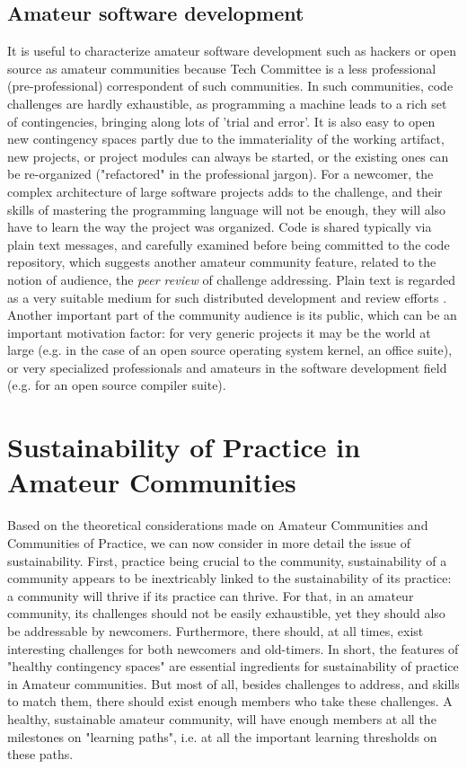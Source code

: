 \documentclass{sig-alt-release2}
\begin{document}
\subsection{Amateur software development}\label{sec:amateur_devel}
It is useful to characterize amateur software development such as hackers \cite{levy94} or open source \cite{kollock99} as amateur communities 
because Tech Committee is a less professional (pre-professional) correspondent of such communities. 
In such communities, code challenges are hardly exhaustible, as programming a machine leads to a rich set of contingencies, bringing along lots of 'trial and error'. 
It is also easy to open new contingency spaces partly due to the immateriality of the working artifact, new projects, or project modules can always be started, or the existing ones can be re-organized ("refactored" in the professional jargon). For a newcomer, the complex architecture of large software projects adds to the challenge, and their skills of mastering the programming language will not be enough, they will also have to learn the way the project was organized.
Code is shared typically via plain text messages, and carefully examined before being committed to the code repository, which suggests another amateur community feature, related to the notion of audience, the \textit{peer review} of challenge addressing. 
Plain text is regarded as a very suitable medium for such distributed development and review efforts \cite{yamauchi00}. 
Another important part of the community audience is its public, which can be an important motivation factor: for very generic projects it may be the world at large (e.g. in the case of an open source operating system kernel, an office suite), or very specialized professionals and amateurs in the software development field (e.g. for an open source compiler suite).

\section{Sustainability of Practice in Amateur Communities}\label{sec:sust}
Based on the theoretical considerations made on Amateur Communities and Communities of Practice, we can now consider in more detail the issue of sustainability. First, practice being crucial to the community, sustainability of a community appears to be inextricably linked to the sustainability of its practice: a community will thrive if its practice can thrive. For that, in an amateur community, its challenges should not be easily exhaustible, yet they should also be addressable by newcomers. Furthermore, there should, at all times, exist interesting challenges for both newcomers and old-timers. In short, the features of "healthy contingency spaces" are essential ingredients for sustainability of practice in Amateur communities. But most of all, besides challenges to address, and skills to match them, there should exist enough members who take these challenges. A healthy, sustainable amateur community, will have enough members at all the milestones on "learning paths", i.e. at all the important learning thresholds on these paths.
\end{document}
